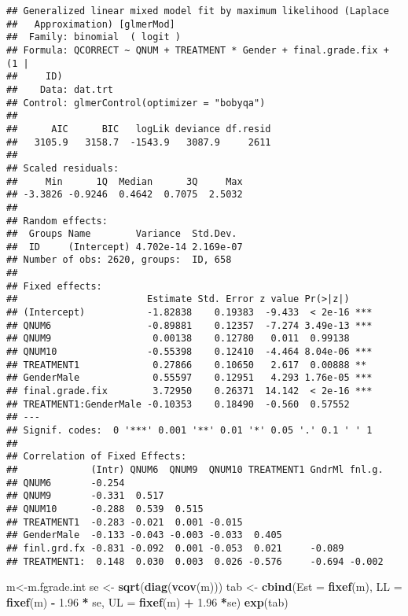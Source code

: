\documentclass[]{article}
\newenvironment{Shaded}{\begin{snugshade}}{\end{snugshade}}
\newcommand{\KeywordTok}[1]{\textcolor[rgb]{0.13,0.29,0.53}{\textbf{#1}}}
\newcommand{\DataTypeTok}[1]{\textcolor[rgb]{0.13,0.29,0.53}{#1}}
\newcommand{\FloatTok}[1]{\textcolor[rgb]{0.00,0.00,0.81}{#1}}
\newcommand{\StringTok}[1]{\textcolor[rgb]{0.31,0.60,0.02}{#1}}
\newcommand{\OperatorTok}[1]{\textcolor[rgb]{0.81,0.36,0.00}{\textbf{#1}}}
\newcommand{\NormalTok}[1]{#1}
\begin{document}
\begin{verbatim}
## Generalized linear mixed model fit by maximum likelihood (Laplace
##   Approximation) [glmerMod]
##  Family: binomial  ( logit )
## Formula: QCORRECT ~ QNUM + TREATMENT * Gender + final.grade.fix + (1 |  
##     ID)
##    Data: dat.trt
## Control: glmerControl(optimizer = "bobyqa")
## 
##      AIC      BIC   logLik deviance df.resid 
##   3105.9   3158.7  -1543.9   3087.9     2611 
## 
## Scaled residuals: 
##     Min      1Q  Median      3Q     Max 
## -3.3826 -0.9246  0.4642  0.7075  2.5032 
## 
## Random effects:
##  Groups Name        Variance  Std.Dev. 
##  ID     (Intercept) 4.702e-14 2.169e-07
## Number of obs: 2620, groups:  ID, 658
## 
## Fixed effects:
##                       Estimate Std. Error z value Pr(>|z|)    
## (Intercept)           -1.82838    0.19383  -9.433  < 2e-16 ***
## QNUM6                 -0.89881    0.12357  -7.274 3.49e-13 ***
## QNUM9                  0.00138    0.12780   0.011  0.99138    
## QNUM10                -0.55398    0.12410  -4.464 8.04e-06 ***
## TREATMENT1             0.27866    0.10650   2.617  0.00888 ** 
## GenderMale             0.55597    0.12951   4.293 1.76e-05 ***
## final.grade.fix        3.72950    0.26371  14.142  < 2e-16 ***
## TREATMENT1:GenderMale -0.10353    0.18490  -0.560  0.57552    
## ---
## Signif. codes:  0 '***' 0.001 '**' 0.01 '*' 0.05 '.' 0.1 ' ' 1
## 
## Correlation of Fixed Effects:
##             (Intr) QNUM6  QNUM9  QNUM10 TREATMENT1 GndrMl fnl.g.
## QNUM6       -0.254                                              
## QNUM9       -0.331  0.517                                       
## QNUM10      -0.288  0.539  0.515                                
## TREATMENT1  -0.283 -0.021  0.001 -0.015                         
## GenderMale  -0.133 -0.043 -0.003 -0.033  0.405                  
## finl.grd.fx -0.831 -0.092  0.001 -0.053  0.021     -0.089       
## TREATMENT1:  0.148  0.030  0.003  0.026 -0.576     -0.694 -0.002
\end{verbatim}

\begin{Shaded}
\begin{Highlighting}[]
\NormalTok{m<-m.fgrade.int}
\NormalTok{se <-}\StringTok{ }\KeywordTok{sqrt}\NormalTok{(}\KeywordTok{diag}\NormalTok{(}\KeywordTok{vcov}\NormalTok{(m)))}
\NormalTok{tab <-}\StringTok{ }\KeywordTok{cbind}\NormalTok{(}\DataTypeTok{Est =} \KeywordTok{fixef}\NormalTok{(m), }\DataTypeTok{LL =} \KeywordTok{fixef}\NormalTok{(m) }\OperatorTok{-}\StringTok{ }\FloatTok{1.96} \OperatorTok{*}\StringTok{ }\NormalTok{se, }\DataTypeTok{UL =} \KeywordTok{fixef}\NormalTok{(m) }\OperatorTok{+}\StringTok{ }\FloatTok{1.96} \OperatorTok{*}\NormalTok{se)}
\KeywordTok{exp}\NormalTok{(tab)}
\end{Highlighting}
\end{Shaded}
\end{document}
